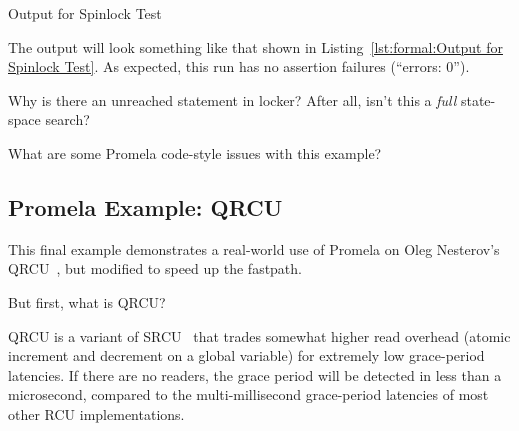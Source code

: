 \begin{listing}[htbp]
\vspace*{-9pt}
\caption{Output for Spinlock Test}
\label{lst:formal:Output for Spinlock Test}
\end{listing}

The output will look something like that shown in
Listing~\ref{lst:formal:Output for Spinlock Test}.
As expected, this run has no assertion failures (``errors: 0'').

\QuickQuiz{}
	Why is there an unreached statement in
	locker?  After all, isn't this a \emph{full} state-space
	search?
 \QuickQuizEnd

\QuickQuiz{}
	What are some Promela code-style issues with this example?
 \QuickQuizEnd


\subsection{Promela Example: QRCU}
\label{sec:formal:Promela Example: QRCU}

This final example demonstrates a real-world use of Promela on Oleg
Nesterov's
QRCU~\cite{OlegNesterov2006QRCU,OlegNesterov2006aQRCU},
but modified to speed up the 
fastpath.

But first, what is QRCU?

QRCU is a variant of SRCU~\cite{PaulEMcKenney2006c}
that trades somewhat higher read overhead
(atomic increment and decrement on a global variable) for extremely
low grace-period latencies.
If there are no readers, the grace period will be detected in less
than a microsecond, compared to the multi-millisecond grace-period
latencies of most other RCU implementations.

